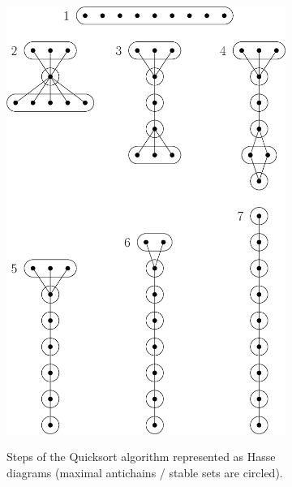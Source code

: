 \begin{figure} \centering \begin{subfigure}[b]{0.4\textwidth}
{\includegraphics[width=\textwidth]{fig/supi/quicksort}} \caption{Steps of the
Quicksort algorithm represented as Hasse diagrams (maximal antichains / stable
sets are circled).} \label{fig:supi:quicksort} \end{subfigure}
\begin{subfigure}[b]{0.4\textwidth}

\end{subfigure}
\end{figure}
